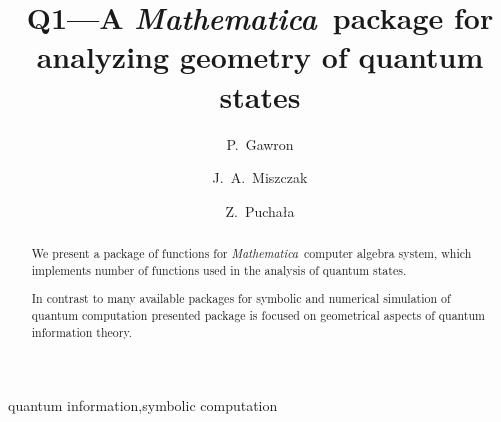 \documentclass[final,5p,times,twocolumn]{elsarticle}
\newcommand{\Mathematica}{\emph{Mathematica}}
\newcommand{\1}{{\rm 1\hspace{-0.9mm}l}}
\begin{document}
\begin{frontmatter}



\title{Q1---A \Mathematica\ package for analyzing geometry of quantum states}


\author{P.~Gawron}
\author{J.~A.~Miszczak}
\author{Z.~Pucha{\l}a}
\address{Institute of Theoretical and Applied Informatics, Polish Academy of 
Sciences, Ba{\l}tycka 5, 44-100 Gliwice, Poland}

\begin{abstract}
We present a package of functions for \Mathematica\ computer algebra system, 
which implements number of functions used in the analysis of quantum states.

In contrast to many available packages for symbolic and numerical simulation of
quantum computation presented package is focused on geometrical aspects of 
quantum information theory.

\end{abstract}

\begin{keyword}
quantum information\sep symbolic computation
\PACS


\end{keyword}

\end{frontmatter}
\end{document}
